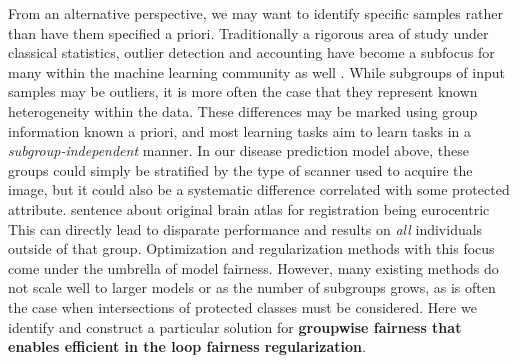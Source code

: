 From an alternative perspective, we may want to identify specific samples rather than have them specified a priori.
Traditionally a rigorous area of study under classical statistics, outlier detection and accounting have become a subfocus for many within the machine learning community as well \citep{golatkar2020eternal,golatkar2020forgetting,huang2020feature,ren2019likelihood}.
While subgroups of input samples may be outliers, it is more often the case that they represent known heterogeneity within the data. 
These differences may be marked using 
group information known a priori, and 
most learning tasks aim to learn tasks
in a \textit{subgroup-independent} manner.
In our disease prediction model above,
these groups could simply be stratified by the type of scanner used to acquire the image, but it could also
be a systematic difference correlated with some protected attribute. {\color{red} sentence about original brain atlas for registration being eurocentric}
This can directly lead to disparate performance and results on \textit{all} individuals outside of that group.
Optimization and regularization methods with this focus come under the umbrella of model fairness.
However, many existing methods do not scale well to larger models or as the number of subgroups grows, as is often the case when intersections of protected classes must be considered. Here we identify and construct a particular solution for \textbf{groupwise fairness that enables efficient in the loop fairness regularization}.


